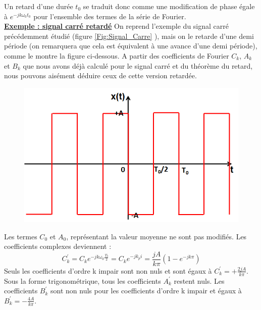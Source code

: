 	Un retard d'une durée $t_{0}$ se traduit donc comme une modification de phase égale à $e^{-jk\omega_{0}t_0}$ pour l'ensemble des termes de la série de Fourier.\\
	
	\underline{\textbf{Exemple : signal carré retardé}}
	On reprend l'exemple du signal carré précédemment étudié (figure \ref{Fig:Signal_Carre} ), mais on le retarde d'une demi période (on remarquera que cela est équivalent à une avance d'une demi période), comme le montre la figure ci-dessous. A partir des coefficients de Fourier $C_k$, $A_k$ et $B_k$ que nous avons déjà calculé pour le signal carré et du théorème du retard, nous pouvons aisément déduire ceux de cette version retardée. 
	\begin{figure}[h!]
		\centering
		\includegraphics[scale=0.5]{images/signal_carre_retard.png}
	\end{figure}
	Les termes $C_0$ et $A_0$, représentant la valeur moyenne ne sont pas modifiés. Les coefficients complexes deviennent :
	\begin{equation*}
	C_k^{'}=C_ke^{-jk\omega_{0}\frac{T_0}{2}}=C_ke^{-jk_pi}=\frac{jA}{k\pi}(1-e^{-jk\pi})
	\end{equation*}
	Seuls les coefficients d'ordre k impair sont non nuls et sont égaux à $C_k^{'}=+\frac{2jA}{k\pi}$. Sous la forme trigonométrique, tous les coefficients $A_k^{'}$ restent nuls. Les coefficients $B_k^{'}$ sont non nuls pour les coefficients d'ordre k impair et égaux à $B_k^{'}=-\frac{4A}{k\pi}$.\\
	
	
	
